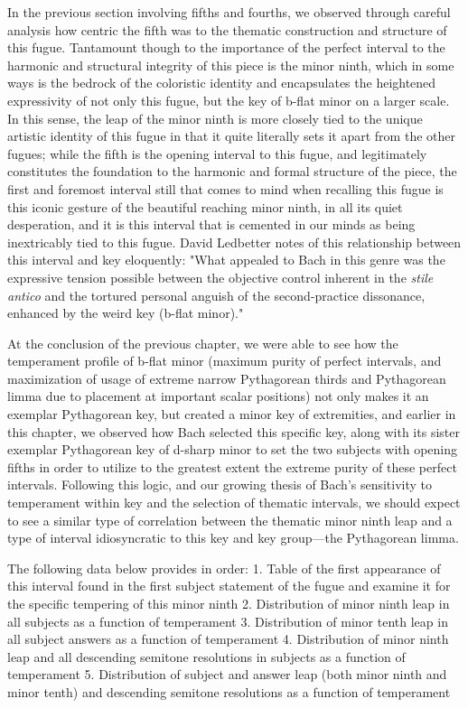     In the previous section involving fifths and fourths, we observed
through careful analysis how centric the fifth was to the thematic
construction and structure of this fugue. Tantamount though to the
importance of the perfect interval to the harmonic and structural
integrity of this piece is the minor ninth, which in some ways is the
bedrock of the coloristic identity and encapsulates the heightened
expressivity of not only this fugue, but the key of b-flat minor on a
larger scale. In this sense, the leap of the minor ninth is more closely
tied to the unique artistic identity of this fugue in that it quite
literally sets it apart from the other fugues; while the fifth is the
opening interval to this fugue, and legitimately constitutes the
foundation to the harmonic and formal structure of the piece, the first
and foremost interval still that comes to mind when recalling this fugue
is this iconic gesture of the beautiful reaching minor ninth, in all its
quiet desperation, and it is this interval that is cemented in our minds
as being inextricably tied to this fugue. David Ledbetter notes of this
relationship between this interval and key eloquently: "What appealed to
Bach in this genre was the expressive tension possible between the
objective control inherent in the \emph{stile antico} and the tortured
personal anguish of the second-practice dissonance, enhanced by the
weird key (b-flat minor)."

At the conclusion of the previous chapter, we were able to see how the
temperament profile of b-flat minor (maximum purity of perfect
intervals, and maximization of usage of extreme narrow Pythagorean
thirds and Pythagorean limma due to placement at important scalar
positions) not only makes it an exemplar Pythagorean key, but created a
minor key of extremities, and earlier in this chapter, we observed how
Bach selected this specific key, along with its sister exemplar
Pythagorean key of d-sharp minor to set the two subjects with opening
fifths in order to utilize to the greatest extent the extreme purity of
these perfect intervals. Following this logic, and our growing thesis of
Bach's sensitivity to temperament within key and the selection of
thematic intervals, we should expect to see a similar type of
correlation between the thematic minor ninth leap and a type of interval
idiosyncratic to this key and key group---the Pythagorean limma.

The following data below provides in order: 1. Table of the first
appearance of this interval found in the first subject statement of the
fugue and examine it for the specific tempering of this minor ninth 2.
Distribution of minor ninth leap in all subjects as a function of
temperament 3. Distribution of minor tenth leap in all subject answers
as a function of temperament 4. Distribution of minor ninth leap and all
descending semitone resolutions in subjects as a function of temperament
5. Distribution of subject and answer leap (both minor ninth and minor
tenth) and descending semitone resolutions as a function of temperament

